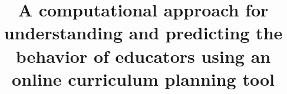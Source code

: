 \documentclass{acm_proc_article-sp}
\begin{document}
\title{A computational approach for understanding and predicting the behavior of educators using an online curriculum planning tool} 

%
%
%
%
%
\end{document}
